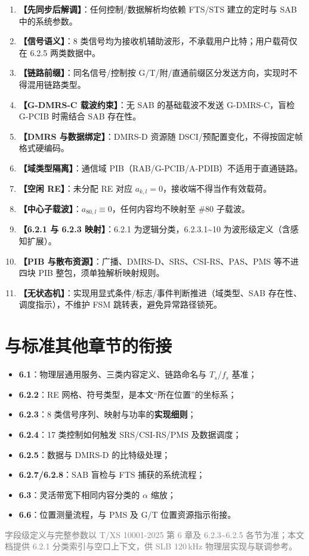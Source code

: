 \documentclass[11pt,a4paper]{ctexart}
\begin{document}
\begin{enumerate}[nosep]
  \item \textbf{【先同步后解调】}：任何控制/数据解析均依赖 FTS/STS 建立的定时与 SAB 中的系统参数。
  \item \textbf{【信号语义】}：8 类信号均为接收机辅助波形，不承载用户比特；用户载荷仅在 6.2.5 两类数据中。
  \item \textbf{【链路前缀】}：同名信号/控制按 G/T/附/直通前缀区分发送方向，实现时不得混用链路类型。
  \item \textbf{【G-DMRS-C 载波约束】}：无 SAB 的基础载波不发送 G-DMRS-C，盲检 G-PCIB 时需结合 SAB 存在性。
  \item \textbf{【DMRS 与数据绑定】}：DMRS-D 资源随 DSCI/预配置变化，不得按固定帧格式硬编码。
  \item \textbf{【域类型隔离】}：通信域 PIB（RAB/G-PCIB/A-PDIB）不适用于直通链路。
  \item \textbf{【空闲 RE】}：未分配 RE 对应 $a_{k,l}{=}0$，接收端不得当作有效载荷。
  \item \textbf{【中心子载波】}：$a_{80,l}\equiv 0$，任何内容均不映射至 \#80 子载波。
  \item \textbf{【6.2.1 与 6.2.3 映射】}：6.2.1 为逻辑分类，6.2.3.1\textasciitilde 10 为波形级定义（含感知扩展）。
  \item \textbf{【PIB 与散布资源】}：广播、DMRS-D、SRS、CSI-RS、PAS、PMS 等不进四块 PIB 整包，须单独解析映射规则。
  \item \textbf{【无状态机】}：实现用显式条件/标志/事件判断推进（域类型、SAB 存在性、调度指示），不维护 FSM 跳转表，避免异常路径锁死。
\end{enumerate}

\section{与标准其他章节的衔接}

\begin{itemize}[nosep]
  \item \textbf{6.1}：物理层通用服务、三类内容定义、链路命名与 $T_s$/$f_s$ 基准；
  \item \textbf{6.2.2}：RE 网格、符号类型，是本文``所在位置''的坐标系；
  \item \textbf{6.2.3}：8 类信号序列、映射与功率的\textbf{实现细则}；
  \item \textbf{6.2.4}：17 类控制如何触发 SRS/CSI-RS/PMS 及数据调度；
  \item \textbf{6.2.5}：数据与 DMRS-D 的比特级处理；
  \item \textbf{6.2.7/6.2.8}：SAB 盲检与 FTS 捕获的系统流程；
  \item \textbf{6.3}：灵活带宽下相同内容分类的 $\alpha$ 缩放；
  \item \textbf{6.6}：位置测量流程，与 PMS 及 G/T 位置资源指示衔接。
\end{itemize}

\vfill
\begin{center}
\small\textcolor{gray}{字段级定义与完整参数以 T/XS 10001-2025 第 6 章及 6.2.3\textasciitilde 6.2.5 各节为准；本文档提供 6.2.1 分类索引与空口上下文，供 SLB 120\,kHz 物理层实现与联调参考。}
\end{center}
\end{document}
